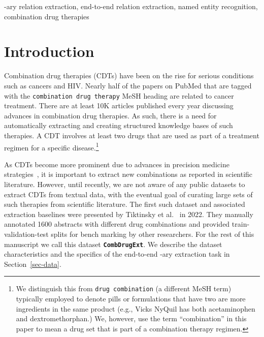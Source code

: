 \documentclass[conference]{IEEEtran}
\begin{document}
\begin{IEEEkeywords}
-ary relation extraction, end-to-end relation extraction, named entity recognition, combination drug therapies
\end{IEEEkeywords}

\section{Introduction}
Combination drug therapies (CDTs) have been on the rise for serious conditions such as cancers and HIV. Nearly half of the papers on PubMed that are tagged with the \texttt{combination drug therapy} MeSH heading are related to cancer treatment. There are at least 10K articles published every year discussing advances in combination drug therapies. As such, there is a need for automatically extracting and creating structured knowledge bases of such therapies. A CDT involves at least two drugs that are used as part of a treatment regimen for a specific disease.\footnote{We distinguish this from  \texttt{drug combination} (a different MeSH term)  typically employed to denote pills or formulations that have two are more ingredients in the same product (e.g., Vicks NyQuil has both acetaminophen and dextromethorphan.) We, however, use the term ``combination'' in this paper to mean a drug set that is part of a combination therapy regimen.}

As CDTs become more prominent due to advances in precision medicine strategies~\cite{klauschen2014combinatorial}, it is important to extract new combinations as reported in scientific literature. However, until recently, we are not aware of any public datasets   to extract CDTs from textual data, with the eventual goal of curating large sets of such therapies from scientific literature. The first such dataset and associated extraction baselines were presented by Tiktinsky et al.~\cite{tiktinsky-etal-2022-dataset} in 2022. They manually annotated 1600 abstracts with different drug combinations and provided train-validation-test splits for bench marking by other researchers. For the rest of this manuscript we call this dataset \textbf{\texttt{CombDrugExt}}. 
We describe the dataset characteristics and the specifics of the end-to-end -ary extraction task in Section~\ref{sec-data}. 
\end{document}

